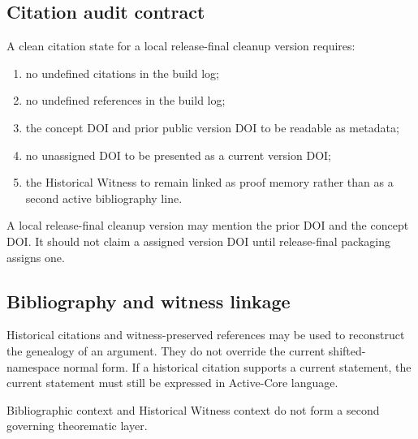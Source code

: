 \subsection{Citation audit contract}
\label{subsec:v408-citation-audit-contract}

\begin{definition}
\label{def:v408-citation-audit-contract}
A clean citation state for a local release-final cleanup version requires:
\begin{enumerate}[leftmargin=*]
 \item no undefined citations in the build log;
 \item no undefined references in the build log;
 \item the concept DOI and prior public version DOI to be readable as
 metadata;
 \item no unassigned DOI to be presented as a current version DOI;
 \item the Historical Witness to remain linked as proof memory rather than as
 a second active bibliography line.
\end{enumerate}
\end{definition}

\begin{remark}
\label{rem:v408-local-cleanup-release-final states-doi-restraint}
A local release-final cleanup version may mention the prior DOI and the concept DOI. It
should not claim a assigned version DOI until release-final packaging assigns one.
\end{remark}

\subsection{Bibliography and witness linkage}
\label{subsec:v408-bibliography-witness-linkage}

\begin{definition}
\label{def:v408-bibliography-witness-linkage}
Historical citations and witness-preserved references may be used to reconstruct
the genealogy of an argument. They do not override the current shifted-namespace normal form.
If a historical citation supports a current statement, the current statement
must still be expressed in Active-Core language.
\end{definition}

\begin{proposition}
\label{prop:v408-bibliographic-context-not-second-governing-layer}
Bibliographic context and Historical Witness context do not form a second
governing theorematic layer.
\end{proposition}

